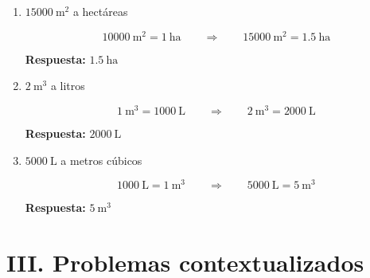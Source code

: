\documentclass[12pt]{article}
\begin{document}
\begin{enumerate}[itemsep=0.4cm]
		\textbf{Respuesta:} $30000\ \text{m}^2$
		
		\newpage
		
		\vspace*{1em}		
		
		\item $15000\ \text{m}^2$ a hectáreas
		
		\[
		10000\ \text{m}^2 = 1\ \text{ha}
		\qquad\Rightarrow\qquad
		15000\ \text{m}^2 = 1.5\ \text{ha}
		\]
		
		\textbf{Respuesta:} $1.5\ \text{ha}$
		
		\item $2\ \text{m}^3$ a litros
		
		\[
		1\ \text{m}^3 = 1000\ \text{L}
		\qquad\Rightarrow\qquad
		2\ \text{m}^3 = 2000\ \text{L}
		\]
		
		\textbf{Respuesta:} $2000\ \text{L}$
		
		\item $5000\ \text{L}$ a metros cúbicos
		
		\[
		1000\ \text{L} = 1\ \text{m}^3
		\qquad\Rightarrow\qquad
		5000\ \text{L} = 5\ \text{m}^3
		\]
		
		\textbf{Respuesta:} $5\ \text{m}^3$
	\end{enumerate}
	
	\section*{III. Problemas contextualizados}
	
\end{document}
